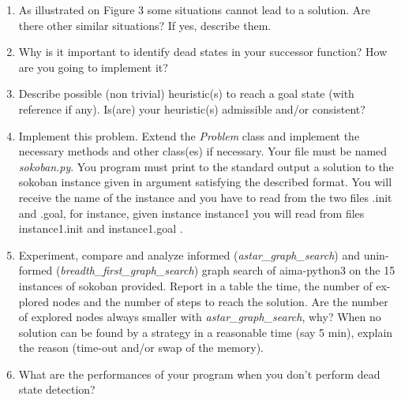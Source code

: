 \begin{enumerate}
 \item As illustrated on Figure 3 some situations cannot lead to a solution. Are there
other similar situations? If yes, describe them.
  \begin{framed}
  \end{framed}
  \item Why is it important to identify dead states in your successor function? How
are you going to implement it?
  \item Describe possible (non trivial) heuristic(s) to reach a goal state (with reference
if any). Is(are) your heuristic(s) admissible and/or consistent?
    \begin{framed}
    \end{framed}
  \item Implement this problem. Extend the \textit{Problem} class and implement the necessary
methods and other class(es) if necessary. Your file must be named \textit{sokoban.py}.
You program must print to the standard output a solution to the sokoban instance
given in argument satisfying the described format. You will receive the name
of the instance and you have to read from the two files .init and .goal, for
instance, given instance instance1 you will read from files instance1.init
and instance1.goal .
    \begin{framed}
    \end{framed}
  \item Experiment, compare and analyze informed (\textit{astar\_graph\_search}) and unin-
formed (\textit{breadth\_first\_graph\_search}) graph search of aima-python3 on the 15
instances of sokoban provided. Report in a table the time, the number of ex-
plored nodes and the number of steps to reach the solution. Are the number of
explored nodes always smaller with \textit{astar\_graph\_search}, why?
When no solution can be found by a strategy in a reasonable time (say 5 min),
explain the reason (time-out and/or swap of the memory).
    \begin{framed}
    \end{framed}
  \item What are the performances of your program when you don’t perform dead state
detection?
    \begin{framed}
    \end{framed}
\end{enumerate}
